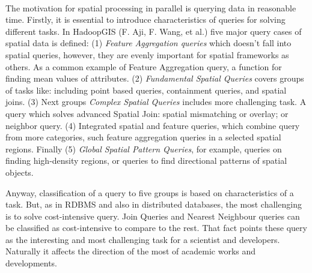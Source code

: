 \documentclass[a4paper,12pt,oneside]{report}
\begin{document}
	\paragraph{}
	
	The motivation for spatial processing in parallel is querying data in reasonable
	time. 
	Firstly, it is essential to introduce characteristics of queries for solving
	different 
	tasks. In HadoopGIS (F. Aji, F. Wang, et al.\cite{hadoopGIS})  five major 
	query cases of spatial data is defined: (1) \textit{Feature Aggregation queries}
	which doesn’t 
	fall into spatial queries, however, they are evenly important for spatial
	frameworks 
	as others. As a common example of Feature Aggregation query, a function for
	finding mean 
	values of attributes. 
	(2) \textit{Fundamental Spatial Queries} covers groups of tasks like: including
	point based 
	queries, containment queries, and spatial joins. (3) Next groups 
	\textit{ Complex Spatial Queries} includes more challenging task. A query which
	solves 
	advanced Spatial Join: spatial mismatching or overlay; or neighbor query. (4)
	Integrated 
	spatial and feature queries, which combine query from more categories, such
	feature 
	aggregation queries in a selected spatial regions. Finally (5) \textit{Global
		Spatial Pattern Queries}, for example, queries on finding high-density regions,
	or 
	queries to find directional patterns of spatial objects.
	
	Anyway, classification of a query to five groups is based on characteristics of
	a task. 
	But, as in RDBMS and also in distributed databases, the most challenging is to
	solve  cost-intensive query. 
	Join Queries and Nearest Neighbour queries can be classified as 
	cost-intensive to compare to the rest. That fact points these query as the
	interesting and
	most challenging task for a scientist and developers. Naturally it affects the
	direction of the most of academic works and developments.
	
\end{document}
